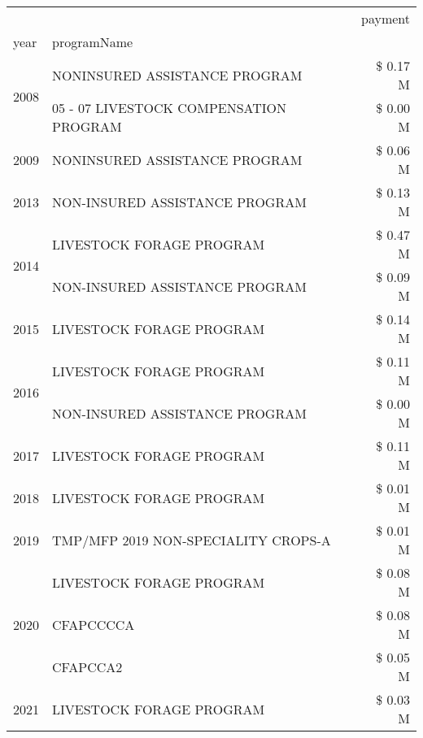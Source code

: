 \begin{tabular}{llr}
\toprule
 &  & payment \\
year & programName &  \\
\midrule
\multirow[t]{2}{*}{2008} & NONINSURED ASSISTANCE PROGRAM & \$ 0.17 M \\
 & 05 - 07 LIVESTOCK COMPENSATION PROGRAM & \$ 0.00 M \\
\cline{1-3}
2009 & NONINSURED ASSISTANCE PROGRAM & \$ 0.06 M \\
\cline{1-3}
2013 & NON-INSURED ASSISTANCE PROGRAM & \$ 0.13 M \\
\cline{1-3}
\multirow[t]{2}{*}{2014} & LIVESTOCK FORAGE PROGRAM & \$ 0.47 M \\
 & NON-INSURED ASSISTANCE PROGRAM & \$ 0.09 M \\
\cline{1-3}
2015 & LIVESTOCK FORAGE PROGRAM & \$ 0.14 M \\
\cline{1-3}
\multirow[t]{2}{*}{2016} & LIVESTOCK FORAGE PROGRAM & \$ 0.11 M \\
 & NON-INSURED ASSISTANCE PROGRAM & \$ 0.00 M \\
\cline{1-3}
2017 & LIVESTOCK FORAGE PROGRAM & \$ 0.11 M \\
\cline{1-3}
2018 & LIVESTOCK FORAGE PROGRAM & \$ 0.01 M \\
\cline{1-3}
2019 & TMP/MFP 2019 NON-SPECIALITY CROPS-A & \$ 0.01 M \\
\cline{1-3}
\multirow[t]{3}{*}{2020} & LIVESTOCK FORAGE PROGRAM & \$ 0.08 M \\
 & CFAPCCCCA & \$ 0.08 M \\
 & CFAPCCA2 & \$ 0.05 M \\
\cline{1-3}
2021 & LIVESTOCK FORAGE PROGRAM & \$ 0.03 M \\
\cline{1-3}
\bottomrule
\end{tabular}
